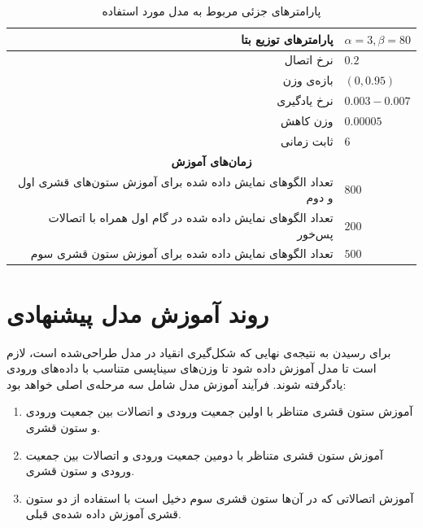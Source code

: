 \documentclass[12pt]{report}
\begin{document}
\begin{table}[p]
{\begin{tabular}{|rrrl|}
		\multicolumn{3}{|r|}{پارامتر‌های توزیع بتا}                                               & $\alpha=3, \beta=80$           \\ \hline
		\multicolumn{3}{|r|}{نرخ اتصال}                                                           & $0.2$                 \\ \hline
		\multicolumn{3}{|r|}{بازه‌ی وزن}                                                          & $(0, 0.95)$           \\ \hline
		\multicolumn{3}{|r|}{نرخ یادگیری}                                                         & $0.003 - 0.007$       \\ \hline
		\multicolumn{3}{|r|}{وزن کاهش}                                                            & $0.00005$             \\ \hline
		\multicolumn{3}{|r|}{ثابت زمانی}                                                          & $6$                   \\ \hline
		\multicolumn{4}{|c|}{\textbf{زمان‌های آموزش}}                                                                   \\ \hline
		\multicolumn{3}{|r|}{تعداد الگو‌های نمایش داده شده برای آموزش ستون‌های قشری اول و دوم} & $800$                \\ \hline
		\multicolumn{3}{|r|}{تعداد الگو‌های نمایش داده شده در گام اول همراه با اتصالات پس‌خور} & $200$                \\ \hline
		\multicolumn{3}{|r|}{تعداد الگو‌های نمایش داده شده برای آموزش ستون قشری سوم}           & $500$                 \\ \hline
\end{tabular}}
\caption{\label{table:parameters-details}پارامتر‌های جزئی مربوط به مدل مورد استفاده}
\end{table}





	
	\section{روند آموزش مدل پیشنهادی}
	برای رسیدن به نتیجه‌ی نهایی که شکل‌گیری انقیاد در مدل طراحی‌شده‌ است، لازم است تا مدل آموزش داده شود تا وزن‌های سیناپسی متناسب با داده‌های ورودی یادگرفته شوند. 
	فرآیند آموزش مدل شامل سه مرحله‌ی اصلی خواهد بود:
	
	\begin{enumerate}
		\item آموزش ستون قشری متناظر با اولین جمعیت ورودی و اتصالات بین جمعیت ورودی و ستون قشری.
		\item آموزش ستون قشری متناظر با دومین جمعیت ورودی و اتصالات بین جمعیت ورودی و ستون قشری.
		\item آموزش اتصالاتی که در آن‌ها ستون قشری سوم دخیل است با استفاده از دو ستون قشری آموزش داده شده‌ی قبلی.
	\end{enumerate}
\end{document}
